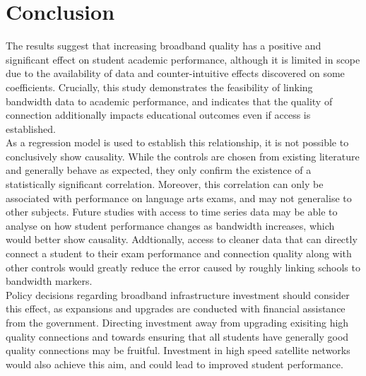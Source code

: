 \documentclass[stu, floatsintext]{apa7}
\begin{document}
    \section{Conclusion}
    The results suggest that increasing broadband quality has a positive and significant effect on student academic performance, although it is limited in scope due to the availability of data and counter-intuitive effects discovered on some coefficients. Crucially, this study demonstrates the feasibility of linking bandwidth data to academic performance, and indicates that the quality of connection additionally impacts educational outcomes even if access is established. \\
    As a regression model is used to establish this relationship, it is not possible to conclusively show causality. While the controls are chosen from existing literature and generally behave as expected, they only confirm the existence of a statistically significant correlation. Moreover, this correlation can only be associated with performance on language arts exams, and may not generalise to other subjects. Future studies with access to time series data may be able to analyse on how student performance changes as bandwidth increases, which would better show causality. Addtionally, access to cleaner data that can directly connect a student to their exam performance and connection quality along with other controls would greatly reduce the error caused by roughly linking schools to bandwidth markers. \\
    Policy decisions regarding broadband infrastructure investment should consider this effect, as expansions and upgrades are conducted with financial assistance from the government. Directing investment away from upgrading exisiting high quality connections and towards ensuring that all students have generally good quality connections may be fruitful. Investment in high speed satellite networks would also achieve this aim, and could lead to improved student performance. 

    \clearpage
    \printbibliography
\end{document}

